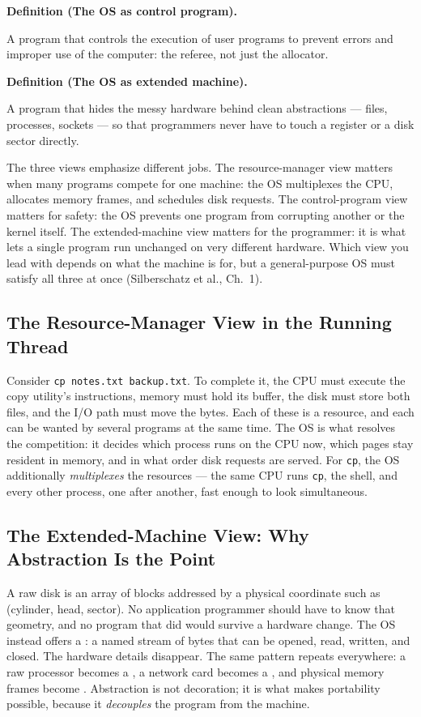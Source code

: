 \documentclass[11pt]{article}
\newenvironment{definitionbox}[1]{%
  \par\noindent\textbf{Definition (#1).}\ \itshape
}{\par\vspace{0.3em}}
\begin{document}
\begin{definitionbox}{The OS as control program}
A program that controls the execution of user programs to prevent errors and improper use of the computer: the referee, not just the allocator.
\end{definitionbox}

\begin{definitionbox}{The OS as extended machine}
A program that hides the messy hardware behind clean abstractions --- files, processes, sockets --- so that programmers never have to touch a register or a disk sector directly.
\end{definitionbox}

The three views emphasize different jobs. The resource-manager view matters when many programs compete for one machine: the OS multiplexes the CPU, allocates memory frames, and schedules disk requests. The control-program view matters for safety: the OS prevents one program from corrupting another or the kernel itself. The extended-machine view matters for the programmer: it is what lets a single program run unchanged on very different hardware. Which view you lead with depends on what the machine is for, but a general-purpose OS must satisfy all three at once (Silberschatz et al., Ch.~1).

\subsection{The Resource-Manager View in the Running Thread}

Consider \texttt{cp notes.txt backup.txt}. To complete it, the CPU must execute the copy utility's instructions, memory must hold its buffer, the disk must store both files, and the I/O path must move the bytes. Each of these is a resource, and each can be wanted by several programs at the same time. The OS is what resolves the competition: it decides which process runs on the CPU now, which pages stay resident in memory, and in what order disk requests are served. For \texttt{cp}, the OS additionally \emph{multiplexes} the resources --- the same CPU runs \texttt{cp}, the shell, and every other process, one after another, fast enough to look simultaneous.

\subsection{The Extended-Machine View: Why Abstraction Is the Point}

A raw disk is an array of blocks addressed by a physical coordinate such as (cylinder, head, sector). No application programmer should have to know that geometry, and no program that did would survive a hardware change. The OS instead offers a : a named stream of bytes that can be opened, read, written, and closed. The hardware details disappear. The same pattern repeats everywhere: a raw processor becomes a , a network card becomes a , and physical memory frames become . Abstraction is not decoration; it is what makes portability possible, because it \emph{decouples} the program from the machine.
\end{document}
